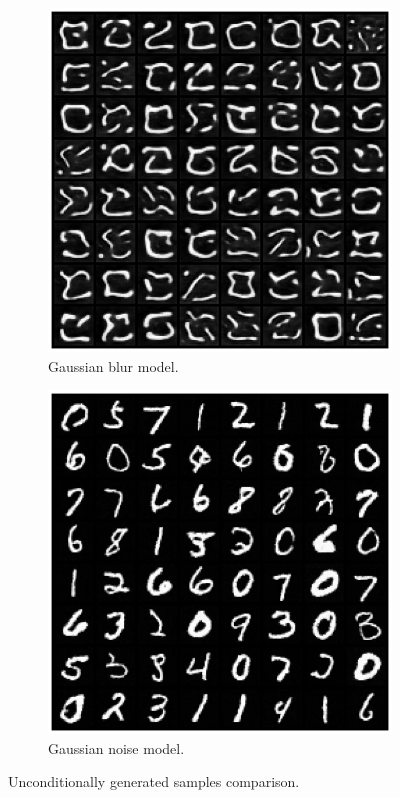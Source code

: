 \documentclass[11pt]{article}
\begin{document}
\begin{figure}[H]
    \centering
    \begin{subfigure}{.4\textwidth}
        \centering
        \includegraphics[width=0.9\linewidth]{figs/q2c_blur_uncond_samples_64.png}
        \caption{Gaussian blur model.}
        \label{fig:uncond_blur}
    \end{subfigure}%
    \hfill
    \begin{subfigure}{.4\textwidth}
        \centering
        \includegraphics[width=0.9\linewidth]{figs/q2c_ddpm_uncond_samples_64.png}
        \caption{Gaussian noise model.}
        \label{fig:uncond_ddpm}
    \end{subfigure}
    \caption{Unconditionally generated samples comparison.}
    \label{fig:q2c_unconditional_samples}
\end{figure}
\end{document}
